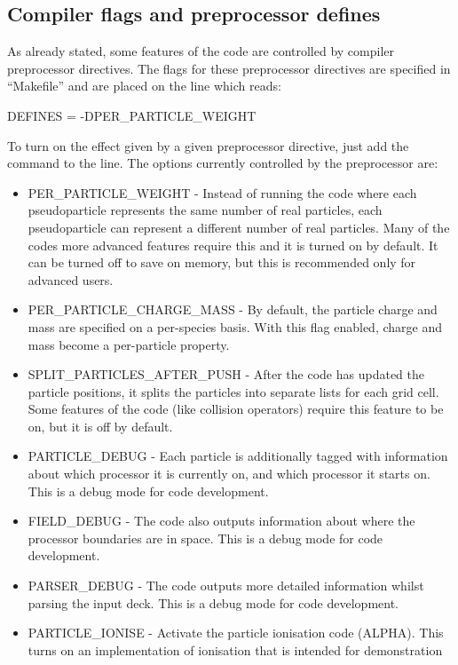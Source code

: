 \subsection{Compiler flags and preprocessor defines}
As already stated, some features of the code are controlled by compiler
preprocessor directives. The flags for these preprocessor directives are
specified in ``Makefile'' and are placed on the line which reads:
\begin{boxverbatim}
DEFINES = -DPER_PARTICLE_WEIGHT
\end{boxverbatim}
To turn on the effect given by a given preprocessor directive, just add the
command  to the  line. The
options currently controlled by the preprocessor are:\\
\begin{itemize}
\item PER\_PARTICLE\_WEIGHT - Instead of running the code where each
  pseudoparticle represents the same number of real particles, each
  pseudoparticle can represent a different number of real particles. Many of
  the codes more advanced features require this and it is turned on by
  default. It can be turned off to save on memory, but this is recommended
  only for advanced users.
\item PER\_PARTICLE\_CHARGE\_MASS - By default, the particle charge and
  mass are specified on a per-species basis. With this flag enabled, charge
  and mass become a per-particle property.
\item SPLIT\_PARTICLES\_AFTER\_PUSH - After the code has updated the particle
  positions, it splits the particles into separate lists for each grid
  cell. Some features of the code (like collision operators) require this
  feature to be on, but it is off by default.
\item PARTICLE\_DEBUG - Each particle is additionally tagged with information
  about which processor it is currently on, and which processor it starts
  on. This is a debug mode for code development.
\item FIELD\_DEBUG - The code also outputs information about where the
  processor boundaries are in space. This is a debug mode for code development.
\item PARSER\_DEBUG - The code outputs more detailed information whilst
  parsing the input deck. This is a debug mode for code development.
\item PARTICLE\_IONISE - Activate the particle ionisation code (ALPHA). This
  turns on an implementation of ionisation that is intended for demonstration

\end{itemize}

